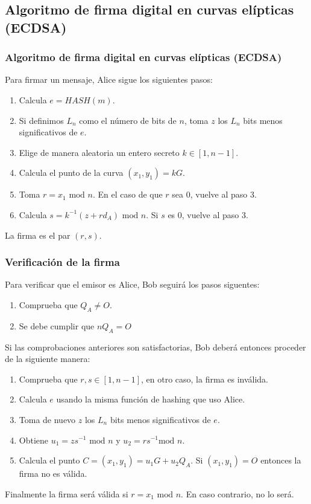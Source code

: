 \documentclass[xcolor=x11names,compress,utf8, 9pt]{beamer}
\begin{document}
\subsection{Algoritmo de firma digital en curvas elípticas (ECDSA)}

\begin{frame}\frametitle{Algoritmo de firma digital en curvas elípticas (ECDSA)}
  Para firmar un mensaje, Alice sigue los siguientes pasos:

\begin{enumerate}
\item Calcula $e=HASH(m)$.
\item Si definimos $L_n$ como el número de bits de $n$, toma $z$ los $L_n$ bits menos
significativos de $e$.
\item Elige de manera aleatoria un entero secreto $k \in [1,n-1]$.
\item Calcula el punto de la curva $(x_1, y_1)=kG$.
\item Toma $r = x_1 \text{ mod }n$. En el caso de que $r$ sea 0,
vuelve al paso 3.
\item Calcula $s=k^{-1}(z+rd_A) \text{ mod }n$. Si $s$ es 0, vuelve al paso 3.
\end{enumerate}

La firma es el par $(r,s)$.
\end{frame}

\begin{frame}\frametitle{Verificación de la firma}

  Para verificar que el emisor es Alice, Bob seguirá los pasos siguentes:
  \begin{enumerate}
\item Comprueba que $Q_A \neq O$.
\item Se debe cumplir que $nQ_A=O$
\end{enumerate}

Si las comprobaciones anteriores son satisfactorias, Bob deberá
entonces proceder de la siguiente manera:

\begin{enumerate}
\item Comprueba que $r,s\in[1, n-1]$, en otro caso, la firma es
inválida.
\item Calcula  $e$ usando la misma función de hashing que uso Alice.
\item Toma de nuevo $z$ los $L_n$ bits menos significativos de $e$.
\item Obtiene $u_1 = zs^{-1} \text{ mod } n$ y $u_2 = rs^{-1} \text{
mod } n$.
\item Calcula el punto $C = (x_1,y_1)=u_1G+u_2Q_A$. Si $(x_1,
y_1)=O$ entonces la firma no es válida.
\end{enumerate}
Finalmente la firma será válida si $r = x_1 \text{ mod }n$. En caso contrario, no lo será.
\end{frame}
\end{document}
